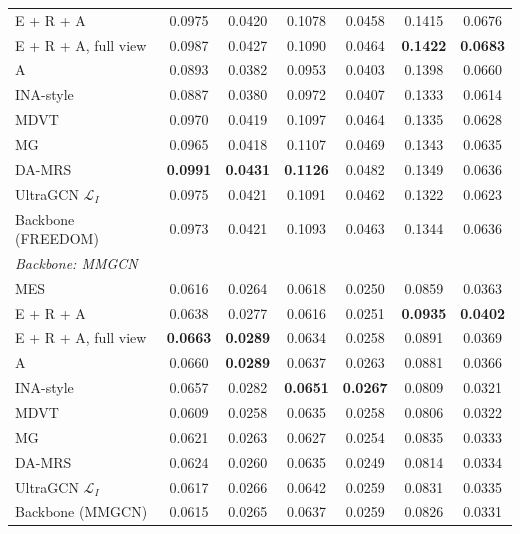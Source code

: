 \begin{table}[!t]
\begin{tabular}{lcccccc}
E + R + A & 0.0975 & 0.0420 & 0.1078 & 0.0458 & 0.1415 & 0.0676 \\
E + R + A, full view & 0.0987 & 0.0427 & 0.1090 & 0.0464 & \textbf{0.1422} & \textbf{0.0683} \\
A & 0.0893 & 0.0382 & 0.0953 & 0.0403 & 0.1398 & 0.0660 \\
INA-style~\cite{iimrec} & 0.0887 & 0.0380 & 0.0972 & 0.0407 & 0.1333 & 0.0614 \\
MDVT~\cite{mdvt} & 0.0970 & 0.0419 & 0.1097 & 0.0464 & 0.1335 & 0.0628 \\
MG~\cite{zhong2024mg} & 0.0965 & 0.0418 & 0.1107 & 0.0469 & 0.1343 & 0.0635 \\
DA-MRS~\cite{xu2024damrs} & \textbf{0.0991} & \textbf{0.0431} & \textbf{0.1126} & 0.0482 & 0.1349 & 0.0636 \\
UltraGCN $\mathcal{L}_I$~\cite{mao2021ultragcn} & 0.0975 & 0.0421 & 0.1091 & 0.0462 & 0.1322 & 0.0623 \\
Backbone (FREEDOM) & 0.0973 & 0.0421 & 0.1093 & 0.0463 & 0.1344 & 0.0636 \\
\midrule
\multicolumn{7}{l}{\textit{Backbone: MMGCN~\cite{wei2019mmgcn}}} \\
MES & 0.0616 & 0.0264 & 0.0618 & 0.0250 & 0.0859 & 0.0363 \\
E + R + A & 0.0638 & 0.0277 & 0.0616 & 0.0251 & \textbf{0.0935} & \textbf{0.0402} \\
E + R + A, full view & \textbf{0.0663} & \textbf{0.0289} & 0.0634 & 0.0258 & 0.0891 & 0.0369 \\
A & 0.0660 & \textbf{0.0289} & 0.0637 & 0.0263 & 0.0881 & 0.0366 \\
INA-style~\cite{iimrec} & 0.0657 & 0.0282 & \textbf{0.0651} & \textbf{0.0267} & 0.0809 & 0.0321 \\
MDVT~\cite{mdvt} & 0.0609 & 0.0258 & 0.0635 & 0.0258 & 0.0806 & 0.0322 \\
MG~\cite{zhong2024mg} & 0.0621 & 0.0263 & 0.0627 & 0.0254 & 0.0835 & 0.0333 \\
DA-MRS~\cite{xu2024damrs} & 0.0624 & 0.0260 & 0.0635 & 0.0249 & 0.0814 & 0.0334 \\
UltraGCN $\mathcal{L}_I$~\cite{mao2021ultragcn} & 0.0617 & 0.0266 & 0.0642 & 0.0259 & 0.0831 & 0.0335 \\
Backbone (MMGCN) & 0.0615 & 0.0265 & 0.0637 & 0.0259 & 0.0826 & 0.0331 \\
\bottomrule
\end{tabular}
\end{table}
